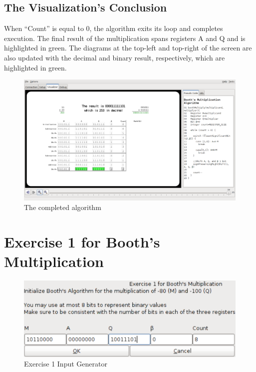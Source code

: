 \documentclass{article}
\begin{document}
\pagebreak

\subsection{The Visualization's Conclusion}
When ``Count'' is equal to 0, the algorithm exits its loop and completes execution.
The final result of the multiplication spans registers A and Q and is highlighted in green.
The diagrams at the top-left and top-right of the screen are also updated with the decimal and binary result, respectively, which are highlighted in green.

\begin{figure}[h]
\centering
\includegraphics[scale=0.3]{finish.pdf}
\caption{The completed algorithm}
\end{figure}

\pagebreak

\section{Exercise 1 for Booth's Multiplication}
\begin{figure}[h]
\centering
\includegraphics[scale=0.4]{ex1ingen.pdf}
\caption{Exercise 1 Input Generator}
\end{figure}

\pagebreak
\end{document}
